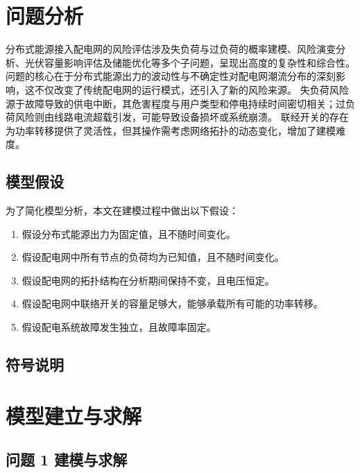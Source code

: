\documentclass{article}
\begin{document}
\section{问题分析}\label{sec:analysis}

分布式能源接入配电网的风险评估涉及失负荷与过负荷的概率建模、风险演变分析、光伏容量影响评估及储能优化等多个子问题，呈现出高度的复杂性和综合性。
问题的核心在于分布式能源出力的波动性与不确定性对配电网潮流分布的深刻影响，这不仅改变了传统配电网的运行模式，还引入了新的风险来源。
失负荷风险源于故障导致的供电中断，其危害程度与用户类型和停电持续时间密切相关；过负荷风险则由线路电流超载引发，可能导致设备损坏或系统崩溃。
联经开关的存在为功率转移提供了灵活性，但其操作需考虑网络拓扑的动态变化，增加了建模难度。

\subsection{模型假设}\label{subsec:assumption}

为了简化模型分析，本文在建模过程中做出以下假设：

\begin{enumerate}
  \item 假设分布式能源出力为固定值，且不随时间变化。\label{assumption:fixed_output}
  \item 假设配电网中所有节点的负荷均为已知值，且不随时间变化。\label{assumption:fixed_load}
  \item 假设配电网的拓扑结构在分析期间保持不变，且电压恒定。\label{assumption:topology_fixed}
  \item 假设配电网中联络开关的容量足够大，能够承载所有可能的功率转移。\label{assumption:large_capacity}
  \item 假设配电系统故障发生独立，且故障率固定。\label{assumption:independent_failure}
\end{enumerate}

\subsection{符号说明}\label{subsec:notation}

\section{模型建立与求解}\label{sec:model}

\subsection{问题 1 建模与求解}\label{subsec:problem1}
\end{document}
